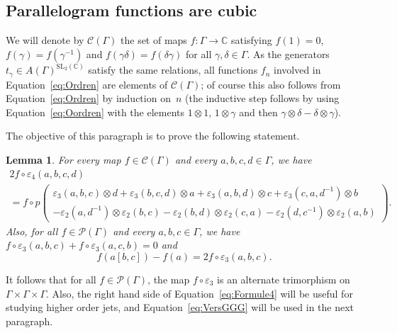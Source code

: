 \documentclass[JEP,XML,SOM,Unicode,NoEqCountersInSection]{cedram}
\let\mathcal\mathscr
\newtheorem{lemma}[theorem]{Lemma}
\theoremstyle{definition}
\newcommand{\CC}{\mathbb{C}}
\newcommand{\SL}{\mathrm{SL}}
\begin{document}
\subsection{Parallelogram functions are cubic}\label{ssec:paralcubic}

We will denote by $\mathcal{C}(\Gamma)$ the set of maps $f:\Gamma\to \CC$
satisfying $f(1)=0$, $f(\gamma)=f(\gamma^{-1})$ and
$f(\gamma\delta)=f(\delta\gamma)$ for all $\gamma,\delta\in \Gamma$.
As the generators $t_{\gamma}\in A(\Gamma)^{\SL_2(\CC)}$ satisfy the same
relations, all functions $f_n$ involved in Equation~\eqref{eq:Ordren} are
elements of $\mathcal{C}(\Gamma)$; of course this also follows
from Equation~\eqref{eq:Ordren} by induction on~$n$
(the inductive step
follows by using Equation~\eqref{eq:Oordren} with the elements
$1\otimes 1$, $1\otimes\gamma$ and then
$\gamma\otimes\delta-\delta\otimes\gamma$).

The objective of this paragraph is to prove the following statement.
\begin{lemma}\label{lem:ParallCubiques}
For every map $f\in\mathcal{C}(\Gamma)$ and every $a,b,c,d\in\Gamma$,
we have
\begin{multline}\label{eq:Formule4}
2f\circ\varepsilon_4(a,b,c,d)\\
= f\circ p\left(\begin{array}{c}
\varepsilon_3(a,b,c)\otimes d+\varepsilon_3(b,c,d)\otimes a +
\varepsilon_3(a,b,d)\otimes c + \varepsilon_3(c,a,d^{-1})\otimes b \\
- \varepsilon_2(a,d^{-1})\otimes\varepsilon_2(b,c)-\varepsilon_2(b,d)
\otimes\varepsilon_2(c,a)-\varepsilon_2(d,c^{-1})\otimes\varepsilon_2(a,b)
\end{array}\right).
\end{multline}
Also, for all $f\in\mathcal{P}(\Gamma)$ and every $a,b,c\in\Gamma$, we
have $f\circ\varepsilon_3(a,b,c)+f\circ \varepsilon_3(a,c,b)=0$ and
\begin{equation}\label{eq:VersGGG}
f(a[b,c])-f(a)= 2f\circ \varepsilon_3(a,b,c).
\end{equation}
\end{lemma}
It follows that for all $f\in\mathcal{P}(\Gamma)$, the map
$f\circ\varepsilon_3$ is an alternate trimorphism on
$\Gamma\times\Gamma\times\Gamma$. Also, the right hand side of
Equation~\eqref{eq:Formule4} will be useful for studying higher order jets,
and Equation~\eqref{eq:VersGGG} will be used in the next paragraph.
\end{document}
